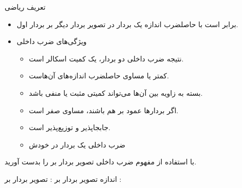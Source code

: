 \ELhold


\begin{ELdefinition}{تعریف ریاضی}


\begin{itemize}
\tightlist
\item
  برابر است با حاصلضرب اندازه یک بردار در تصویر بردار دیگر بر بردار اول.
\end{itemize}

\end{ELdefinition}

\begin{ELunit}


\begin{itemize}
\tightlist
\item
  ویژگی‌های ضرب داخلی

  \begin{itemize}
  \item
    نتیجه ضرب داخلی دو بردار، یک کمیت اسکالر است.
  \item
    کمتر یا مساوی حاصلضرب اندازه‌های آن‌هاست.
  \item
    بسته به زاویه بین آن‌ها می‌تواند کمیتی مثبت یا منفی باشد.
  \item
    اگر بردارها عمود بر هم باشند، مساوی صفر است.
  \item
    جابجاپذیر و توزیع‌پذیر است.
  \item
    ضرب داخلی یک بردار در خودش
  \end{itemize}
\end{itemize}

\end{ELunit}


\begin{ELexample}{}

با استفاده از مفهوم ضرب داخلی تصویر بردار  بر  را بدست آورید.


\begin{ELsolution}


اندازه تصویر بردار  بر :
تصویر بردار  بر :

\end{ELsolution}

\end{ELexample}

